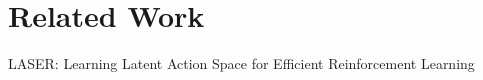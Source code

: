 \chapter{Related Work}\label{chap:relatedwork}


LASER: Learning Latent Action Space for Efficient Reinforcement Learning